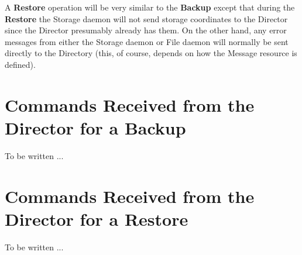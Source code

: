 A {\bf Restore} operation will be very similar to the {\bf Backup} except that
during the {\bf Restore} the Storage daemon will not send storage coordinates
to the Director since the Director presumably already has them. On the other
hand, any error messages from either the Storage daemon or File daemon will
normally be sent directly to the Directory (this, of course, depends on how
the Message resource is defined). 

\section{Commands Received from the Director for a Backup}

To be written ... 

\section{Commands Received from the Director for a Restore}

To be written ... 
